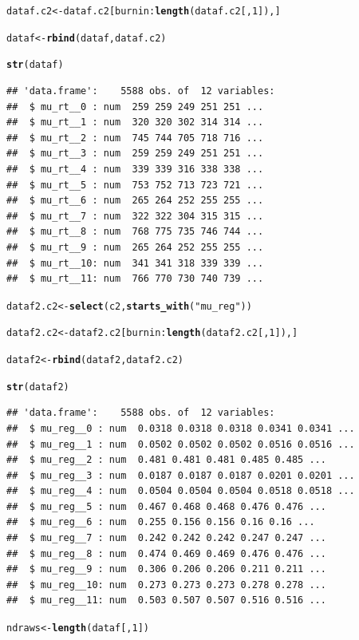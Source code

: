 \documentclass{article}\usepackage[]{graphicx}\usepackage[]{color}
\makeatletter
\newcommand{\hlnum}[1]{\textcolor[rgb]{0.686,0.059,0.569}{#1}}%
\newcommand{\hlstr}[1]{\textcolor[rgb]{0.192,0.494,0.8}{#1}}%
\newcommand{\hlopt}[1]{\textcolor[rgb]{0,0,0}{#1}}%
\newcommand{\hlstd}[1]{\textcolor[rgb]{0.345,0.345,0.345}{#1}}%
\newcommand{\hlkwb}[1]{\textcolor[rgb]{0.69,0.353,0.396}{#1}}%
\newcommand{\hlkwd}[1]{\textcolor[rgb]{0.737,0.353,0.396}{\textbf{#1}}}%
\newenvironment{kframe}{%
 \def\at@end@of@kframe{}%
 \ifinner\ifhmode%
  \def\at@end@of@kframe{\end{minipage}}%
  \begin{minipage}{\columnwidth}%
 \fi\fi%
 \def\FrameCommand##1{\hskip\@totalleftmargin \hskip-\fboxsep
 \colorbox{shadecolor}{##1}\hskip-\fboxsep
     \hskip-\linewidth \hskip-\@totalleftmargin \hskip\columnwidth}%
 \MakeFramed {\advance\hsize-\width
   \@totalleftmargin\z@ \linewidth\hsize
   \@setminipage}}%
 {\par\unskip\endMakeFramed%
 \at@end@of@kframe}
\newenvironment{knitrout}{}{} %
\makeatother
\begin{document}
\begin{knitrout}
\begin{kframe}
\begin{alltt}
\hlstd{dataf.c2} \hlkwb{<-} \hlstd{dataf.c2[burnin}\hlopt{:}\hlkwd{length}\hlstd{(dataf.c2[,} \hlnum{1}\hlstd{]), ]}

\hlstd{dataf} \hlkwb{<-} \hlkwd{rbind}\hlstd{(dataf, dataf.c2)}

\hlkwd{str}\hlstd{(dataf)}
\end{alltt}
\begin{verbatim}
## 'data.frame':	5588 obs. of  12 variables:
##  $ mu_rt__0 : num  259 259 249 251 251 ...
##  $ mu_rt__1 : num  320 320 302 314 314 ...
##  $ mu_rt__2 : num  745 744 705 718 716 ...
##  $ mu_rt__3 : num  259 259 249 251 251 ...
##  $ mu_rt__4 : num  339 339 316 338 338 ...
##  $ mu_rt__5 : num  753 752 713 723 721 ...
##  $ mu_rt__6 : num  265 264 252 255 255 ...
##  $ mu_rt__7 : num  322 322 304 315 315 ...
##  $ mu_rt__8 : num  768 775 735 746 744 ...
##  $ mu_rt__9 : num  265 264 252 255 255 ...
##  $ mu_rt__10: num  341 341 318 339 339 ...
##  $ mu_rt__11: num  766 770 730 740 739 ...
\end{verbatim}
\begin{alltt}
\hlstd{dataf2.c2} \hlkwb{<-} \hlkwd{select}\hlstd{(c2,} \hlkwd{starts_with}\hlstd{(}\hlstr{"mu_reg"}\hlstd{))}

\hlstd{dataf2.c2} \hlkwb{<-} \hlstd{dataf2.c2[burnin}\hlopt{:}\hlkwd{length}\hlstd{(dataf2.c2[,} \hlnum{1}\hlstd{]), ]}

\hlstd{dataf2} \hlkwb{<-} \hlkwd{rbind}\hlstd{(dataf2, dataf2.c2)}

\hlkwd{str}\hlstd{(dataf2)}
\end{alltt}
\begin{verbatim}
## 'data.frame':	5588 obs. of  12 variables:
##  $ mu_reg__0 : num  0.0318 0.0318 0.0318 0.0341 0.0341 ...
##  $ mu_reg__1 : num  0.0502 0.0502 0.0502 0.0516 0.0516 ...
##  $ mu_reg__2 : num  0.481 0.481 0.481 0.485 0.485 ...
##  $ mu_reg__3 : num  0.0187 0.0187 0.0187 0.0201 0.0201 ...
##  $ mu_reg__4 : num  0.0504 0.0504 0.0504 0.0518 0.0518 ...
##  $ mu_reg__5 : num  0.467 0.468 0.468 0.476 0.476 ...
##  $ mu_reg__6 : num  0.255 0.156 0.156 0.16 0.16 ...
##  $ mu_reg__7 : num  0.242 0.242 0.242 0.247 0.247 ...
##  $ mu_reg__8 : num  0.474 0.469 0.469 0.476 0.476 ...
##  $ mu_reg__9 : num  0.306 0.206 0.206 0.211 0.211 ...
##  $ mu_reg__10: num  0.273 0.273 0.273 0.278 0.278 ...
##  $ mu_reg__11: num  0.503 0.507 0.507 0.516 0.516 ...
\end{verbatim}
\begin{alltt}
\hlstd{ndraws} \hlkwb{<-} \hlkwd{length}\hlstd{(dataf[,} \hlnum{1}\hlstd{])}


\end{alltt}
\end{kframe}
\end{knitrout}
\end{document}
